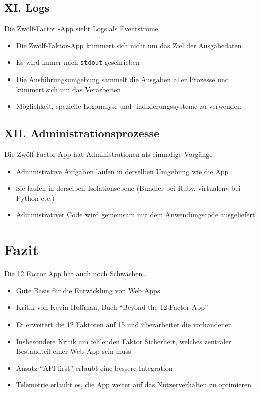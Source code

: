 \documentclass[fleqn,10pt]{SelfArx} %
\begin{document}
\subsection{XI. Logs}
Die Zwölf-Factor -App sieht Logs als Eventströme
\begin{itemize}
	\item Die Zwölf-Faktor-App kümmert sich nicht um das Ziel der Ausgabedaten
	\item Es wird immer nach \texttt{stdout} geschrieben
	\item Die Ausführungsumgebung sammelt die Ausgaben aller Prozesse und kümmert sich um das Verarbeiten
	\item Möglichkeit, spezielle Loganalyse und -indizierungssysteme zu verwenden
\end{itemize}
\subsection{XII. Administrationsprozesse}
Die Zwölf-Factor-App hat Administrationen als einmalige Vorgänge
\begin{itemize}
	\item Administrative Aufgaben laufen in derselben Umgebung wie die App
	\item Sie laufen in derselben Isolationsebene (Bundler bei Ruby, virtualenv bei Python etc.)
	\item Administrativer Code wird gemeinsam mit dem Anwendungscode ausgeliefert
\end{itemize}
\section{Fazit}
Die 12 Factor App hat auch noch Schwächen\ldots
	\begin{itemize}
	\item Gute Basis für die Entwicklung von Web Apps
	\item Kritik von Kevin Hoffman, Buch \enquote{Beyond the 12 Factor App}~\cite{beyond}
	\item Er erweitert die 12 Faktoren auf 15 und überarbeitet die vorhandenen
	\item Insbesondere Kritik am fehlenden Faktor Sicherheit, welches zentraler Bestandteil einer Web App sein muss
	\item Ansatz \enquote{API first} erlaubt eine bessere Integration
	\item Telemetrie erlaubt es, die App weiter auf das Nutzerverhalten zu optimieren
\end{itemize}
\nocite{beyond}



\printbibliography
\end{document}
